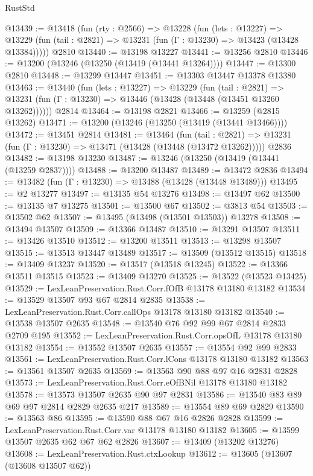 \begin{lexlean}{RustStd}
\begin{coremodule}
@13439 := @13418
    (fun (rty : @2566) =>
    @13228
      (fun (lets : @13227) =>
      @13229 (fun (tail : @2821) => @13231 (fun (Γ : @13230) => @13423 (@13428 @13384)))))
    @2810
@13440 := @13198 @13227
@13441 := @13256 @2810
@13446 := @13200 (@13246 (@13250 (@13419 (@13441 @13264))))
@13447 := @13300 @2810
@13448 := @13299 @13447
@13451 := @13303 @13447 @13378 @13380
@13463 := @13440
    (fun (lets : @13227) =>
    @13229
      (fun (tail : @2821) =>
      @13231 (fun (Γ : @13230) => @13446 (@13428 (@13448 (@13451 @13260 @13262))))))
    @2814
@13464 := @13198 @2821
@13466 := @13259 (@2815 @13262)
@13471 := @13200 (@13246 (@13250 (@13419 (@13441 @13466))))
@13472 := @13451 @2814
@13481 := @13464
    (fun (tail : @2821) => @13231 (fun (Γ : @13230) => @13471 (@13428 (@13448 (@13472 @13262)))))
    @2836
@13482 := @13198 @13230
@13487 := @13246 (@13250 (@13419 (@13441 (@13259 @2837))))
@13488 := @13200 @13487
@13489 := @13472 @2836
@13494 := @13482 (fun (Γ : @13230) => @13488 (@13428 (@13448 @13489)))
@13495 := @2 @13277
@13497 := @13135 @54 @13276
@13498 := @13497 @62
@13500 := @13135 @7 @13275
@13501 := @13500 @67
@13502 := @3813 @54
@13503 := @13502 @62
@13507 := @13495 (@13498 (@13501 @13503)) @13278
@13508 := @13494 @13507
@13509 := @13366 @13487
@13510 := @13291 @13507
@13511 := @13426 @13510
@13512 := @13200 @13511
@13513 := @13298 @13507
@13515 := @13513 @13447 @13489
@13517 := @13509 (@13512 @13515)
@13518 := @13409 @13237
@13520 := @13517 (@13518 @13245)
@13522 := @13366 @13511 @13515
@13523 := @13409 @13270
@13525 := @13522 (@13523 @13425)
@13529 := LexLeanPreservation.Rust.Corr.fOfB @13178 @13180 @13182
@13534 := @13529 @13507 @93 @67 @2814 @2835
@13538 := LexLeanPreservation.Rust.Corr.callOps @13178 @13180 @13182
@13540 := @13538 @13507 @2635
@13548 := @13540 @76 @92 @99 @67 @2814 @2833 @2709 @195
@13552 := LexLeanPreservation.Rust.Corr.opsOfL @13178 @13180 @13182
@13554 := @13552 @13507 @2635
@13557 := @13554 @92 @99 @2833
@13561 := LexLeanPreservation.Rust.Corr.lCons @13178 @13180 @13182
@13563 := @13561 @13507 @2635
@13569 := @13563 @90 @88 @97 @16 @2831 @2828
@13573 := LexLeanPreservation.Rust.Corr.eOfBNil @13178 @13180 @13182
@13578 := @13573 @13507 @2635 @90 @97 @2831
@13586 := @13540 @83 @89 @69 @97 @2814 @2829 @2635 @217
@13589 := @13554 @89 @69 @2829
@13590 := @13563 @86
@13595 := @13590 @88 @67 @16 @2826 @2828
@13599 := LexLeanPreservation.Rust.Corr.var @13178 @13180 @13182
@13605 := @13599 @13507 @2635 @62 @67 @62 @2826
@13607 := @13409 (@13202 @13276)
@13608 := LexLeanPreservation.Rust.ctxLookup
@13612 := @13605 (@13607 (@13608 @13507 @62))

\end{coremodule}
\end{lexlean}
